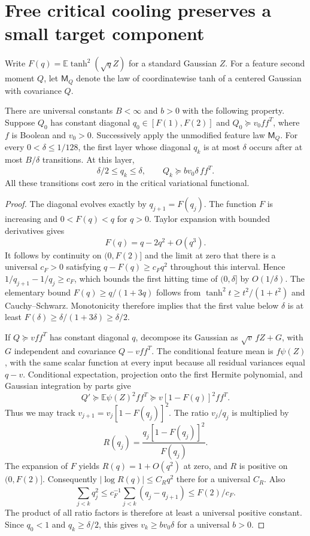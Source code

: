 \section{Free critical cooling preserves a small target component}
\label{sec:critical-free-cooling}

Write $F(q)=\mathbb E\tanh^2(\sqrt qZ)$ for a standard Gaussian $Z$.
For a feature second moment $Q$, let $\mathsf M_Q$ denote the law of
coordinatewise tanh of a centered Gaussian with covariance $Q$.

\begin{lemma}
\label{lem:critical-free-cooling}
There are universal constants $B<\infty$ and $b>0$ with the following
property. Suppose $Q_0$ has constant diagonal $q_0\in[F(1),F(2)]$ and
$Q_0\succeq v_0ff^T$, where $f$ is Boolean and $v_0>0$.
Successively apply the unmodified feature law $\mathsf M_Q$.
For every $0<\delta\le1/128$, the first layer whose diagonal $q_k$
is at most $\delta$ occurs after at most $B/\delta$ transitions.
At this layer,
\[
 \delta/2\le q_k\le\delta,
 \qquad Q_k\succeq b v_0\delta\,ff^T.
\]
All these transitions cost zero in the critical variational functional.
\end{lemma}

\begin{proof}
The diagonal evolves exactly by $q_{j+1}=F(q_j)$.
The function $F$ is increasing and $0<F(q)<q$ for $q>0$.
Taylor expansion with bounded derivatives gives
\[
 F(q)=q-2q^2+O(q^3).
\]
It follows by continuity on $(0,F(2)]$ and the limit at zero that
there is a universal $c_F>0$ satisfying
$q-F(q)\ge c_Fq^2$ throughout this interval.
Hence $1/q_{j+1}-1/q_j\ge c_F$, which bounds the first hitting time
of $(0,\delta]$ by $O(1/\delta)$.
The elementary bound $F(q)\ge q/(1+3q)$ follows from
$\tanh^2t\ge t^2/(1+t^2)$ and Cauchy--Schwarz.
Monotonicity therefore implies that the first value below $\delta$
is at least $F(\delta)\ge\delta/(1+3\delta)\ge\delta/2$.

If $Q\succeq vff^T$ has constant diagonal $q$, decompose its Gaussian
as $\sqrt v\,fZ+G$, with $G$ independent and covariance $Q-vff^T$.
The conditional feature mean is $f\psi(Z)$, with the same scalar
function at every input because all residual variances equal $q-v$.
Conditional expectation, projection onto the first Hermite polynomial,
and Gaussian integration by parts give
\[
 Q'\succeq\mathbb E\psi(Z)^2ff^T
       \succeq v[1-F(q)]^2ff^T.
\]
Thus we may track $v_{j+1}=v_j[1-F(q_j)]^2$.
The ratio $v_j/q_j$ is multiplied by
\[
 R(q_j)=\frac{q_j[1-F(q_j)]^2}{F(q_j)}.
\]
The expansion of $F$ yields $R(q)=1+O(q^2)$ at zero, and $R$ is
positive on $(0,F(2)]$. Consequently
$|\log R(q)|\le C_Rq^2$ there for a universal $C_R$.
Also
\[
 \sum_{j<k}q_j^2
 \le c_F^{-1}\sum_{j<k}(q_j-q_{j+1})\le F(2)/c_F.
\]
The product of all ratio factors is therefore at least a universal
positive constant. Since $q_0<1$ and $q_k\ge\delta/2$, this gives
$v_k\ge b v_0\delta$ for a universal $b>0$.
\end{proof}
